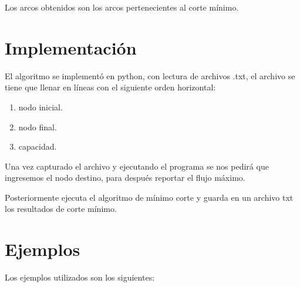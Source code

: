 \documentclass{report}
\begin{document}
Los arcos obtenidos son los arcos pertenecientes al corte mínimo.

\section{Implementación}
El algoritmo se implementó en python, con lectura de archivos .txt, el archivo se tiene que llenar en líneas con el siguiente orden horizontal: 
\begin{enumerate}
\item nodo inicial.
\item nodo final.
\item capacidad.
\end{enumerate}

Una vez capturado el archivo y ejecutando el programa se nos pedirá que ingresemos el nodo destino, para después reportar el flujo máximo.

Posteriormente ejecuta el algoritmo de mínimo corte y guarda en un archivo txt los resultados de corte mínimo.
\section{Ejemplos}
Los ejemplos utilizados son los siguientes:
\end{document}
